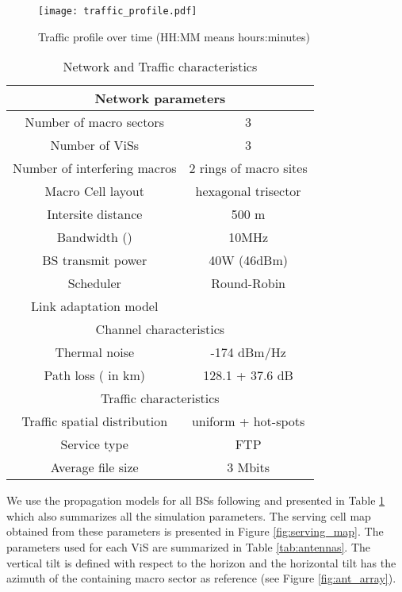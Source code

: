 \documentclass[conference]{IEEEtran}
\begin{document}
\begin{figure}[!ht]
\centering
\texttt{[image: traffic\_profile.pdf]}
\caption{Traffic profile over time (HH:MM means hours:minutes)}
\label{fig:traff}
\end{figure}

\begin{table}[!t]
\small
\renewcommand{\arraystretch}{1.3}
\caption{Network and Traffic characteristics}
\label{tab:params}
\centering
\begin{tabular}{|c|c|}
\hline
\multicolumn{2}{|c|}{Network parameters} \\
\hline
Number of macro sectors & 3 \\
\hline
Number of \acp{ViS} & 3 \\
\hline
Number of interfering macros & 2 rings of macro sites \\
\hline
Macro Cell layout & hexagonal trisector \\
\hline
Intersite distance & 500 m \\
\hline
Bandwidth () & 10MHz \\
\hline
\ac{BS} transmit power & 40W (46dBm) \\
\hline
Scheduler & Round-Robin \\
\hline
Link adaptation model &  \cite{3gpp_evolveduniversalterrestrial_2012} \\
\hline
\multicolumn{2}{|c|}{Channel characteristics} \\
\hline
Thermal noise & -174 dBm/Hz \\
\hline
Path loss ( in km) & 128.1 + 37.6  dB \\
\hline
\multicolumn{2}{|c|}{Traffic characteristics} \\
\hline
Traffic spatial distribution & uniform + hot-spots \\
\hline
Service type & FTP \\
\hline
Average file size & 3 Mbits \\
\hline
\end{tabular}
\end{table}

	We use the propagation models for all \acp{BS} following \cite[Page 61]{3gpp_evolveduniversalterrestrial_2010} and presented in Table \ref{tab:params} which also summarizes all the simulation parameters. The serving cell map obtained from these parameters is presented in Figure \ref{fig:serving_map}. The parameters used for each \ac{ViS} are summarized in Table \ref{tab:antennas}. The vertical tilt is defined with respect to the horizon and the horizontal tilt has the azimuth of the containing macro sector as reference (see Figure \ref{fig:ant_array}).
\end{document}
